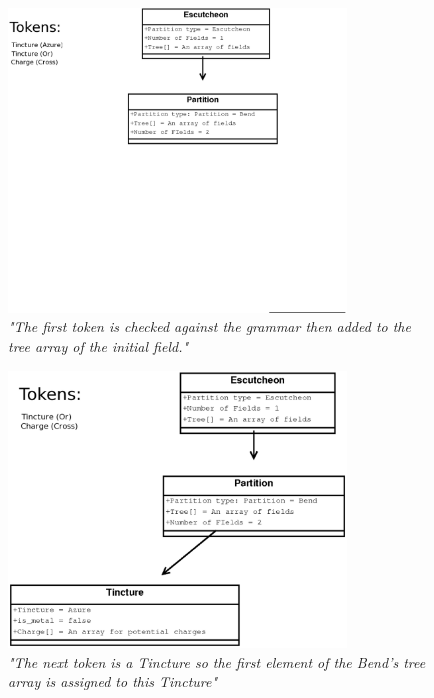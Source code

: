 \begin{figure}[H]
  \centering
    \includegraphics[width=0.8\textwidth]{parsing/images/Parsing4.eps}
  \caption{\emph{"The first token is checked against the grammar then added to the tree array of the initial field."}}
  
\end{figure}


\begin{figure}[H]
  \centering
    \includegraphics[width=0.8\textwidth]{parsing/images/Parsing3.eps}
  \caption{\emph{"The next token is a Tincture so the first element of the Bend's tree array is assigned to this Tincture"}}
  
\end{figure}

